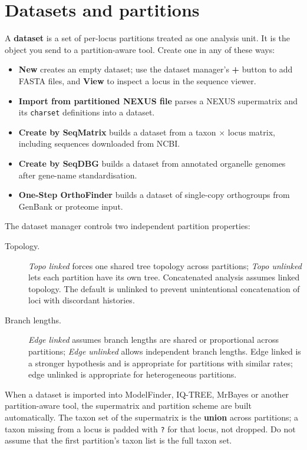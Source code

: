\documentclass[10pt]{report}
\begin{document}
\section{Datasets and partitions}

A \textbf{dataset} is a set of per-locus partitions treated as one analysis
unit. It is the object you send to a partition-aware tool. Create one in any of
these ways:

\begin{itemize}
  \item \textbf{New} creates an empty dataset; use the dataset manager's
        \textbf{+} button to add FASTA files, and \textbf{View} to inspect a
        locus in the sequence viewer.
  \item \textbf{Import from partitioned NEXUS file} parses a NEXUS
        supermatrix and its \texttt{charset} definitions into a dataset.
  \item \textbf{Create by SeqMatrix} builds a dataset from a taxon $\times$
        locus matrix, including sequences downloaded from NCBI.
  \item \textbf{Create by SeqDBG} builds a dataset from annotated organelle
        genomes after gene-name standardisation.
  \item \textbf{One-Step OrthoFinder} builds a dataset of single-copy
        orthogroups from GenBank or proteome input.
\end{itemize}

The dataset manager controls two independent partition properties:

\begin{description}
  \item[Topology.] \emph{Topo linked} forces one shared tree topology across
        partitions; \emph{Topo unlinked} lets each partition have its own tree.
        Concatenated analysis assumes linked topology. The default is
        unlinked to prevent unintentional concatenation of loci with
        discordant histories.
  \item[Branch lengths.] \emph{Edge linked} assumes branch lengths are shared
        or proportional across partitions; \emph{Edge unlinked} allows
        independent branch lengths. Edge linked is a stronger hypothesis and
        is appropriate for partitions with similar rates; edge unlinked is
        appropriate for heterogeneous partitions.
\end{description}

When a dataset is imported into ModelFinder, IQ-TREE, MrBayes or another
partition-aware tool, the supermatrix and partition scheme are built
automatically. The taxon set of the supermatrix is the \textbf{union} across
partitions; a taxon missing from a locus is padded with \texttt{?} for that
locus, not dropped. Do not assume that the first partition's taxon list is the
full taxon set.
\end{document}
